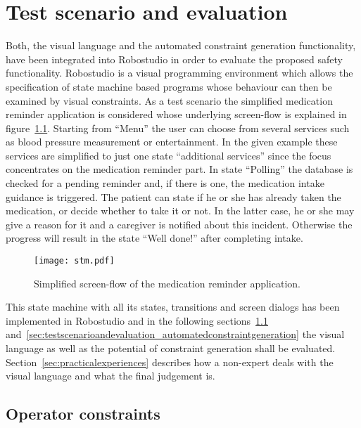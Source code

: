 \chapter{Test scenario and evaluation}
\label{chap:testscenarioandevaluation}

Both, the visual language and the automated constraint generation functionality, have been integrated into Robostudio in order to evaluate the proposed safety functionality. Robostudio is a visual programming environment which allows the specification of state machine based programs whose behaviour can then be examined by visual constraints.
As a test scenario the simplified medication reminder application is considered whose underlying screen-flow is explained in figure~\ref{fig:medicationreminder}. Starting from ``Menu'' the user can choose from several services such as blood pressure measurement or entertainment. In the given example these services are simplified to just one state ``additional services'' since the focus concentrates on the medication reminder part. In state ``Polling'' the database is checked for a pending reminder and, if there is one, the medication intake guidance is triggered. The patient can state if he or she has already taken the medication, or decide whether to take it or not. In the latter case, he or she may give a reason for it and a caregiver is notified about this incident. Otherwise the progress will result in the state ``Well done!'' after completing intake.

\begin{figure}[htbp]
  \centering
  \texttt{[image: stm.pdf]}
  \caption{Simplified screen-flow of the medication reminder application.}
  \label{fig:medicationreminder}
\end{figure}

This state machine with all its states, transitions and screen dialogs has been implemented in Robostudio and in the following sections~\ref{sec:testscenarioandevaluation_operatorconstraints} and~\ref{sec:testscenarioandevaluation_automatedconstraintgeneration} the visual language as well as the potential of constraint generation shall be evaluated. Section~\ref{sec:practicalexperiences} describes how a non-expert deals with the visual language and what the final judgement is.



\section{Operator constraints}
\label{sec:testscenarioandevaluation_operatorconstraints}

